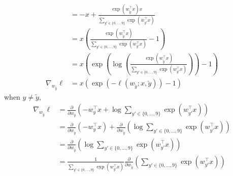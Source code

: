 \documentclass{exam}
\begin{document}
\begin{questions}
\begin{parts}
\begin{align*}
                                        & = -x + \frac{\exp(w^\top_{\tilde{y}} x)x}{\sum_{y' \in \{0, \dots , 9\}} \exp(w^\top_{y'} x)}                                                                                                                                                                                  \\
                                        & = x\left(\frac{\exp(w^\top_{\tilde{y}} x)}{\sum_{y' \in \{0, \dots , 9\}} \exp(w^\top_{y'} x)} - 1\right)                                                                                                                                                                      \\
                                        & = x\left(\exp \left( \log \left(\frac{\exp(w^\top_{\tilde{y}}x)}{\sum_{y' \in \{0, \dots , 9\}} \exp(w^\top_{y'} x)}\right)\right) - 1\right)                                                                                                                                  \\
            \nabla_{w_{\tilde{y}}} \ell & = x\left(\exp \left(-\ell(w_{\tilde{y}} ; x, \tilde{y})\right) - 1\right)
        \end{align*}
        when $y \neq \tilde{y}$,
        \begin{align*}
            \nabla_{w_{\tilde{y}}} \ell & = \frac{\partial}{\partial w_{\tilde{y}}}\left( -w^\top_{y} x + \log \sum_{y' \in \{0, \dots , 9\}} \exp(w^\top_{y'} x)\right)                                                                                                                                            \\
                                        & = \frac{\partial}{\partial w_{\tilde{y}}}\left( -w^\top_{y} x \right) + \frac{\partial}{\partial w_{\tilde{y}}}\left(\log \sum_{y' \in \{0, \dots , 9\}} \exp(w^\top_{y'} x)\right)                                                                                       \\
                                        & = \frac{\partial}{\partial w_{\tilde{y}}}\left(\log \sum_{y' \in \{0, \dots , 9\}} \exp(w^\top_{y'} x)\right)                                                                                                                                                             \\
                                        & = \frac{1}{\sum_{y' \in \{0, \dots , 9\}} \exp(w^\top_{y'} x)} \frac{\partial}{\partial w_{\tilde{y}}}\left(\sum_{y' \in \{0, \dots , 9\}} \exp(w^\top_{y'} x)\right)                                                                                                     \\

\end{align*}
\end{parts}
\end{questions}
\end{document}
